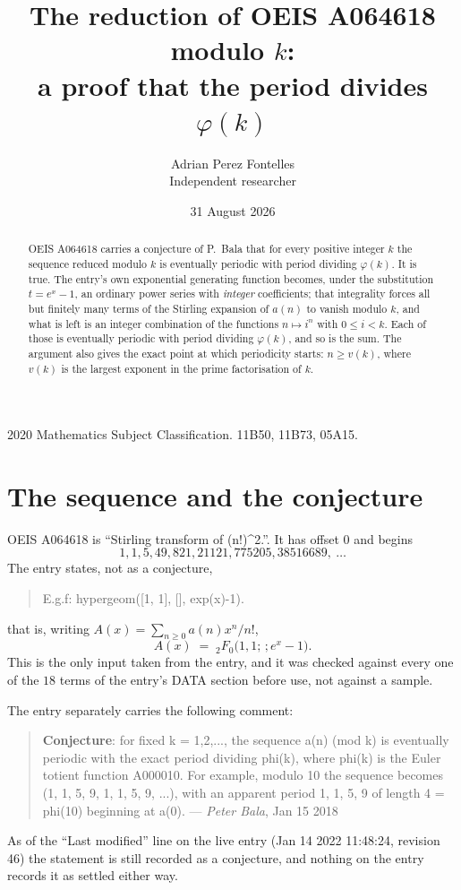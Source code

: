 \documentclass[11pt,a4paper]{article}
\title{The reduction of OEIS A064618 modulo $k$:\\ a proof that the period divides
$\varphi(k)$}
\author{Adrian Perez Fontelles\\ \small Independent researcher}
\date{31 August 2026}
\theoremstyle{plain}
\theoremstyle{definition}
\begin{document}
\maketitle

\begin{abstract}
OEIS A064618 carries a conjecture of P.~Bala that for every positive integer $k$ the
sequence reduced modulo $k$ is eventually periodic with period dividing $\varphi(k)$.
It is true. The entry's own exponential generating function becomes, under the
substitution $t=e^{x}-1$, an ordinary power series with \emph{integer} coefficients;
that integrality forces all but finitely many terms of the Stirling expansion of $a(n)$
to vanish modulo $k$, and what is left is an integer combination of the functions
$n\mapsto i^{n}$ with $0\le i<k$. Each of those is eventually periodic with period
dividing $\varphi(k)$, and so is the sum. The argument also gives the exact point at
which periodicity starts: $n\ge v(k)$, where $v(k)$ is the largest exponent in the
prime factorisation of $k$.
\end{abstract}

\noindent\small 2020 Mathematics Subject Classification. 11B50, 11B73, 05A15.\normalsize

\section{The sequence and the conjecture}

OEIS A064618 is ``Stirling transform of (n!)\^{}2.''. It has offset $0$ and begins
\[
1, 1, 5, 49, 821, 21121, 775205, 38516689,\ \dots
\]
The entry states, not as a conjecture,
\begin{quote}\small
E.g.f: hypergeom([1, 1], [], exp(x)-1).
\end{quote}
that is, writing $A(x)=\sum_{n\ge 0}a(n)x^{n}/n!$,
\begin{equation}\label{eq:egf}
A(x)\;=\;{}_{2}F_{0}\bigl(1,1;\,;e^{x}-1\bigr).
\end{equation}
This is the only input taken from the entry, and it was checked against every one of the
$18$ terms of the entry's DATA section before use, not against a sample.

The entry separately carries the following comment:
\begin{quote}\small
\textbf{Conjecture}: for fixed k = 1,2,..., the sequence a(n) (mod k) is eventually periodic with the exact period dividing phi(k), where phi(k) is the Euler totient function A000010. For example, modulo 10 the sequence becomes (1, 1, 5, 9, 1, 1, 5, 9, ...), with an apparent period 1, 1, 5, 9 of length 4 = phi(10) beginning at a(0). --- \emph{Peter Bala}, Jan 15 2018
\end{quote}
As of the ``Last modified'' line on the live entry (Jan 14 2022 11:48:24, revision
46) the statement is still recorded as a conjecture, and nothing on the entry
records it as settled either way.
\end{document}
